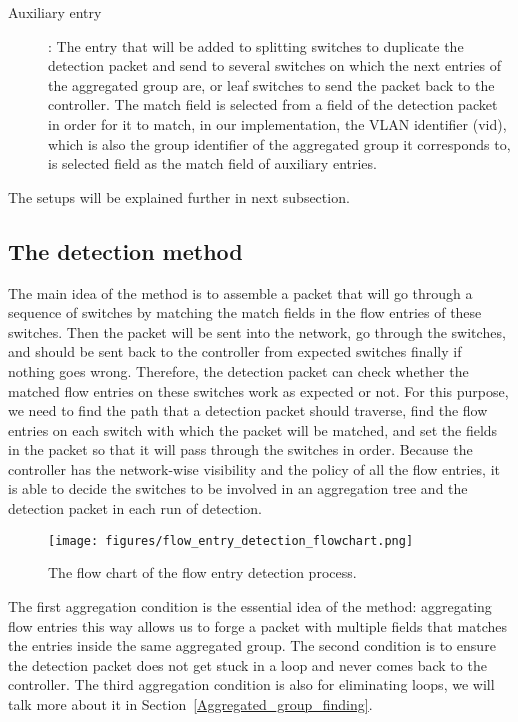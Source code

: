 \begin{description}
\item 
[Auxiliary entry]:
The entry that will be added to splitting switches to duplicate the detection packet and send to several  switches on which the next entries of the aggregated group are, or leaf switches to send the packet back to the controller. The match field is selected from a field of the detection packet in order for it to match, in our implementation, the VLAN identifier (vid), which is also the group identifier of the aggregated group it corresponds to, is selected field as the match field of auxiliary entries.
\end{description}

The setups will be explained further in next subsection.

\subsection{The detection method}
\label{Detection_method}

The main idea of the method is to assemble a packet that will go through a sequence of switches by matching the match fields in the flow entries of these switches. Then the packet will be sent into the network, go through the switches, and should be sent back to the controller from expected switches finally if nothing goes wrong. Therefore, the detection packet can check whether the matched flow entries on these switches work as expected or not. For this purpose, we need to find the path that a detection packet should traverse, find the flow entries on each switch with which the packet will be matched, and set the fields in the packet so that it will pass through the switches in order. Because the controller has the network-wise visibility and the policy of all the flow entries, it is able to decide the switches to be involved in an aggregation tree and the detection packet in each run of detection. 

\begin{figure}[H]
\centering
\texttt{[image: figures/flow\_entry\_detection\_flowchart.png]}
\caption{The flow chart of the flow entry detection process.}
\label{flow_entry_detection_flowchart}
\end{figure}

The first aggregation condition is the essential idea of the method: aggregating flow entries this way allows us to forge a packet with multiple fields that matches the entries inside the same aggregated group. The second condition is to ensure the detection packet does not get stuck in a loop and never comes back to the controller. The third aggregation condition is also for eliminating loops, we will talk more about it in Section~\ref{Aggregated_group_finding}.

